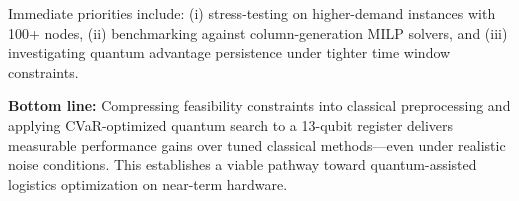 Immediate priorities include: (i) stress-testing on higher-demand instances 
with 100+ nodes, (ii) benchmarking against column-generation MILP solvers, 
and (iii) investigating quantum advantage persistence under tighter time 
window constraints.

\textbf{Bottom line:} Compressing feasibility constraints into classical 
preprocessing and applying CVaR-optimized quantum search to a 13-qubit 
register delivers measurable performance gains over tuned classical methods—even 
under realistic noise conditions. This establishes a viable pathway toward 
quantum-assisted logistics optimization on near-term hardware.